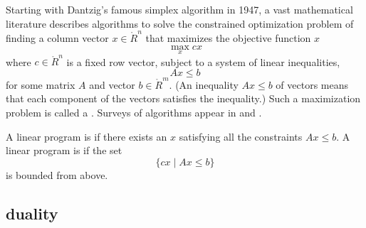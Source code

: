 Starting with Dantzig's famous simplex algorithm in 1947, 
a vast mathematical literature describes algorithms to
solve the constrained optimization problem of finding a column vector
$x\in\ring{R}^n$ that maximizes the objective function $ x$
\begin{equation}\label{eqn:lp1}
\max_{x}  c x
\end{equation}
where $c\in\ring{R}^n$ is a fixed row vector, subject to a system of
linear inequalities,
\begin{equation}\label{eqn:lp2}
A x\le b
\end{equation} 
for some matrix $A$ and vector $b\in \ring{R}^m$.  (An inequality $A
x\le b$ of vectors means that each component of the vectors satisfies
the inequality.)  Such a maximization problem is called a
.  Surveys of algorithms appear in
\cite{Wri05} and \cite{Tod02}.

%

A linear program is  if there exists an $x$ satisfying
all the constraints $A x \le b$.  A linear program is 
if the set 
\[
\{c x \mid A x \le b\}
\]
is bounded from above.

\subsection{duality}


